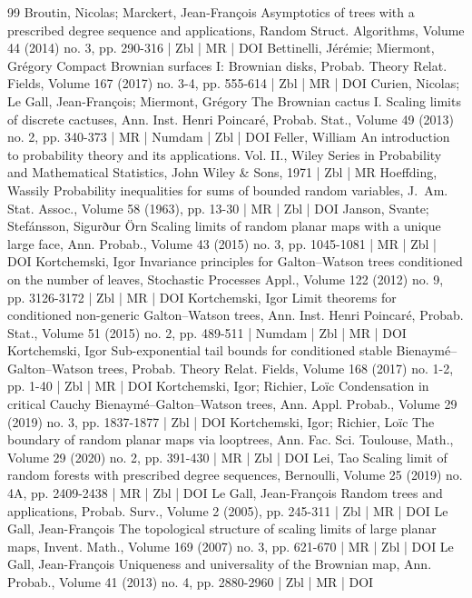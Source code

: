 \begin{thebibliography}{99}
Broutin, Nicolas; Marckert, Jean-François Asymptotics of trees with a prescribed degree sequence and applications, Random Struct. Algorithms, Volume 44 (2014) no. 3, pp. 290-316 | Zbl | MR | DOI
Bettinelli, Jérémie; Miermont, Grégory Compact Brownian surfaces I: Brownian disks, Probab. Theory Relat. Fields, Volume 167 (2017) no. 3-4, pp. 555-614 | Zbl | MR | DOI
Curien, Nicolas; Le Gall, Jean-François; Miermont, Grégory The Brownian cactus I. Scaling limits of discrete cactuses, Ann. Inst. Henri Poincaré, Probab. Stat., Volume 49 (2013) no. 2, pp. 340-373 | MR | Numdam | Zbl | DOI
Feller, William An introduction to probability theory and its applications. Vol. II., Wiley Series in Probability and Mathematical Statistics, John Wiley \& Sons, 1971 | Zbl | MR
Hoeffding, Wassily Probability inequalities for sums of bounded random variables, J. Am. Stat. Assoc., Volume 58 (1963), pp. 13-30 | MR | Zbl | DOI
Janson, Svante; Stefánsson, Sigurður Örn Scaling limits of random planar maps with a unique large face, Ann. Probab., Volume 43 (2015) no. 3, pp. 1045-1081 | MR | Zbl | DOI
Kortchemski, Igor Invariance principles for Galton–Watson trees conditioned on the number of leaves, Stochastic Processes Appl., Volume 122 (2012) no. 9, pp. 3126-3172 | Zbl | MR | DOI
Kortchemski, Igor Limit theorems for conditioned non-generic Galton–Watson trees, Ann. Inst. Henri Poincaré, Probab. Stat., Volume 51 (2015) no. 2, pp. 489-511 | Numdam | Zbl | MR | DOI
Kortchemski, Igor Sub-exponential tail bounds for conditioned stable Bienaymé–Galton–Watson trees, Probab. Theory Relat. Fields, Volume 168 (2017) no. 1-2, pp. 1-40 | Zbl | MR | DOI
Kortchemski, Igor; Richier, Loïc Condensation in critical Cauchy Bienaymé–Galton–Watson trees, Ann. Appl. Probab., Volume 29 (2019) no. 3, pp. 1837-1877 | Zbl | DOI
Kortchemski, Igor; Richier, Loïc The boundary of random planar maps via looptrees, Ann. Fac. Sci. Toulouse, Math., Volume 29 (2020) no. 2, pp. 391-430 | MR | Zbl | DOI
Lei, Tao Scaling limit of random forests with prescribed degree sequences, Bernoulli, Volume 25 (2019) no. 4A, pp. 2409-2438 | MR | Zbl | DOI
Le Gall, Jean-François Random trees and applications, Probab. Surv., Volume 2 (2005), pp. 245-311 | Zbl | MR | DOI
Le Gall, Jean-François The topological structure of scaling limits of large planar maps, Invent. Math., Volume 169 (2007) no. 3, pp. 621-670 | MR | Zbl | DOI
Le Gall, Jean-François Uniqueness and universality of the Brownian map, Ann. Probab., Volume 41 (2013) no. 4, pp. 2880-2960 | Zbl | MR | DOI

\end{thebibliography}
